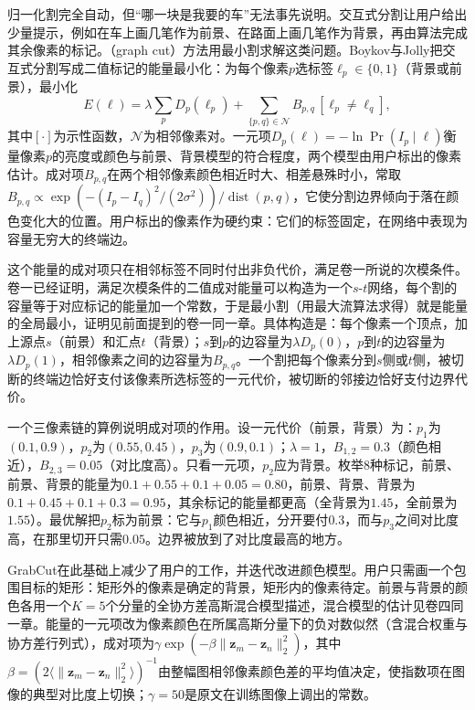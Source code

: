 归一化割完全自动，但“哪一块是我要的车”无法事先说明。交互式分割让用户给出少量提示，例如在车上画几笔作为前景、在路面上画几笔作为背景，再由算法完成其余像素的标记。（graph cut）方法用最小割求解这类问题。Boykov与Jolly把交互式分割写成二值标记的能量最小化：为每个像素$p$选标签$\ell_p\in\{0,1\}$（背景或前景），最小化
\begin{equation}
  E(\bm\ell)=\lambda\sum_{p}D_p(\ell_p)+\sum_{\{p,q\}\in\mathcal N}B_{p,q}\,[\ell_p\neq\ell_q],
  \label{eq:vision-features-graph-cut}
\end{equation}
其中$[\cdot]$为示性函数，$\mathcal N$为相邻像素对。一元项$D_p(\ell)=-\ln\Pr(I_p\mid\ell)$衡量像素$p$的亮度或颜色与前景、背景模型的符合程度，两个模型由用户标出的像素估计。成对项$B_{p,q}$在两个相邻像素颜色相近时大、相差悬殊时小，常取$B_{p,q}\propto\exp(-(I_p-I_q)^2/(2\sigma^2))/\operatorname{dist}(p,q)$，它使分割边界倾向于落在颜色变化大的位置。用户标出的像素作为硬约束：它们的标签固定，在网络中表现为容量无穷大的终端边。

这个能量的成对项只在相邻标签不同时付出非负代价，满足卷一所说的次模条件。卷一已经证明，满足次模条件的二值成对能量可以构造为一个$s$-$t$网络，每个割的容量等于对应标记的能量加一个常数，于是最小割（用最大流算法求得）就是能量的全局最小，证明见前面提到的卷一同一章。具体构造是：每个像素一个顶点，加上源点$s$（前景）和汇点$t$（背景）；$s$到$p$的边容量为$\lambda D_p(0)$，$p$到$t$的边容量为$\lambda D_p(1)$，相邻像素之间的边容量为$B_{p,q}$。一个割把每个像素分到$s$侧或$t$侧，被切断的终端边恰好支付该像素所选标签的一元代价，被切断的邻接边恰好支付边界代价。

一个三像素链的算例说明成对项的作用。设一元代价（前景，背景）为：$p_1$为$(0.1,0.9)$，$p_2$为$(0.55,0.45)$，$p_3$为$(0.9,0.1)$；$\lambda=1$，$B_{1,2}=0.3$（颜色相近），$B_{2,3}=0.05$（对比度高）。只看一元项，$p_2$应为背景。枚举8种标记，前景、前景、背景的能量为$0.1+0.55+0.1+0.05=0.80$，前景、背景、背景为$0.1+0.45+0.1+0.3=0.95$，其余标记的能量都更高（全背景为$1.45$，全前景为$1.55$）。最优解把$p_2$标为前景：它与$p_1$颜色相近，分开要付$0.3$，而与$p_3$之间对比度高，在那里切开只需$0.05$。边界被放到了对比度最高的地方。

GrabCut在此基础上减少了用户的工作，并迭代改进颜色模型。用户只需画一个包围目标的矩形：矩形外的像素是确定的背景，矩形内的像素待定。前景与背景的颜色各用一个$K=5$个分量的全协方差高斯混合模型描述，混合模型的估计见卷四同一章。能量的一元项改为像素颜色在所属高斯分量下的负对数似然（含混合权重与协方差行列式），成对项为$\gamma\exp(-\beta\lVert\bm z_m-\bm z_n\rVert_2^2)$，其中$\beta=(2\langle\lVert\bm z_m-\bm z_n\rVert_2^2\rangle)^{-1}$由整幅图相邻像素颜色差的平均值决定，使指数项在图像的典型对比度上切换；$\gamma=50$是原文在训练图像上调出的常数。

